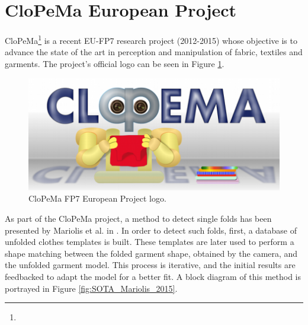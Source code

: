 \section{CloPeMa European Project}
\label{sota:clopema}

CloPeMa\footnote{} is a recent EU-FP7 research project (2012-2015) whose objective is to advance the state of the art in perception and manipulation of fabric, textiles and garments. The project's official logo can be seen in Figure \ref{fig:SOTA_CloPeMa_logo}.

\begin{figure}[thpb]
    \centering
    \includegraphics[width=0.85
    \textwidth]{figures/SOTA_CloPeMa_logo.png}
    \caption{CloPeMa FP7 European Project logo.}
    \label{fig:SOTA_CloPeMa_logo}
\end{figure}

 As part of the CloPeMa project, a method to detect single folds has been presented by Mariolis et al. in \cite{Mariolis2013, Mariolis2015}. In order to detect such folds, first, a database of unfolded clothes templates is built. These templates are later used to perform a shape matching between the folded garment shape, obtained by the camera, and the unfolded garment model. This process is iterative, and the initial results are feedbacked to adapt the model for a better fit. A block diagram of this method is portrayed in Figure \ref{fig:SOTA_Mariolis_2015}.
 
\pagebreak

